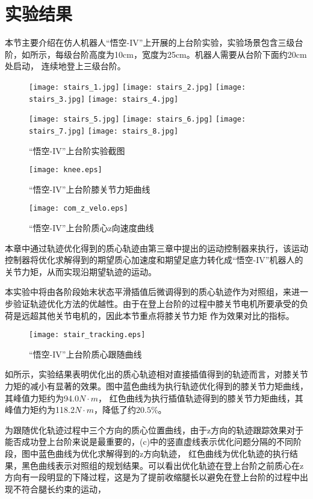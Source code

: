 \section{实验结果}
\label{stair_experiment}
本节主要介绍在仿人机器人“悟空-IV”上开展的上台阶实验，实验场景包含三级台阶，如所示，每级台阶高度为10cm，宽度为25cm。机器人需要从台阶下面约20cm处启动，
连续地登上三级台阶。
\begin{figure}[h]
    \centering
    \texttt{[image: stairs\_1.jpg]}
    \texttt{[image: stairs\_2.jpg]}
    \texttt{[image: stairs\_3.jpg]}
    \texttt{[image: stairs\_4.jpg]}

    \texttt{[image: stairs\_5.jpg]}
    \texttt{[image: stairs\_6.jpg]}
    \texttt{[image: stairs\_7.jpg]}
    \texttt{[image: stairs\_8.jpg]}   
    \caption{\label{fig:stairs}“悟空-IV”上台阶实验截图}
\end{figure}
\begin{figure}[htbp]
    \centering
    \texttt{[image: knee.eps]} 
    \caption{\label{fig:knee_torque}“悟空-IV”上台阶膝关节力矩曲线}
\end{figure}
\begin{figure}[htbp]
    \centering
    \texttt{[image: com\_z\_velo.eps]} 
    \caption{\label{fig:com_z_velo}“悟空-IV”上台阶质心z向速度曲线}
\end{figure}
本章中通过轨迹优化得到的质心轨迹由第三章中提出的运动控制器来执行，该运动控制器将优化求解得到的期望质心加速度和期望足底力转化成“悟空-IV”机器人的关节力矩，从而实现沿期望轨迹的运动。

本实验中将由各阶段始末状态平滑插值后微调得到的质心轨迹作为对照组，来进一步验证轨迹优化方法的优越性。由于在登上台阶的过程中膝关节电机所要承受的负荷是远超其他关节电机的，因此本节重点将膝关节力矩
作为效果对比的指标。
\begin{figure}[htbp]
    \centering
    \texttt{[image: stair\_tracking.eps]} 
    \caption{\label{fig:track_com}“悟空-IV”上台阶质心跟随曲线}
\end{figure}
如所示，实验结果表明优化出的质心轨迹相对直接插值得到的轨迹而言，对膝关节力矩的减小有显著的效果。图中蓝色曲线为执行轨迹优化得到的膝关节力矩曲线，其峰值力矩约为94.0$N\cdot m$，
红色曲线为执行插值轨迹得到的膝关节力矩曲线，其峰值力矩约为118.2$N\cdot m$，降低了约$20.5\%$。

为跟随优化轨迹过程中三个方向的质心位置曲线，由于z方向的轨迹跟踪效果对于能否成功登上台阶来说是最重要的，(c)中的竖直虚线表示优化问题分隔的不同阶段，图中蓝色曲线为优化求解得到的z方向轨迹，
红色曲线为优化轨迹的执行结果，黑色曲线表示对照组的规划结果。可以看出优化轨迹在登上台阶之前质心在z方向有一段明显的下降过程，这是为了提前收缩腿长以避免在登上台阶的过程中出现不符合腿长约束的运动，

